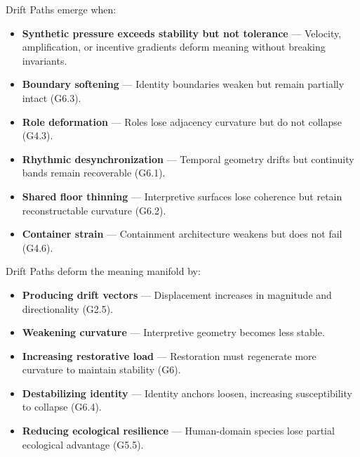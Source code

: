 \medskip

\noindent Drift Paths emerge when:

\begin{itemize}[leftmargin=1.2cm]
    \item \textbf{Synthetic pressure exceeds stability but not tolerance} —
    Velocity, amplification, or incentive gradients deform meaning without
    breaking invariants.

    \item \textbf{Boundary softening} — Identity boundaries weaken but remain
    partially intact (G6.3).

    \item \textbf{Role deformation} — Roles lose adjacency curvature but do not
    collapse (G4.3).

    \item \textbf{Rhythmic desynchronization} — Temporal geometry drifts but
    continuity bands remain recoverable (G6.1).

    \item \textbf{Shared floor thinning} — Interpretive surfaces lose coherence
    but retain reconstructable curvature (G6.2).

    \item \textbf{Container strain} — Containment architecture weakens but does
    not fail (G4.6).
\end{itemize}

\medskip

\noindent Drift Paths deform the meaning manifold by:

\begin{itemize}[leftmargin=1.2cm]
    \item \textbf{Producing drift vectors} — Displacement increases in magnitude
    and directionality (G2.5).

    \item \textbf{Weakening curvature} — Interpretive geometry becomes less
    stable.

    \item \textbf{Increasing restorative load} — Restoration must regenerate more
    curvature to maintain stability (G6).

    \item \textbf{Destabilizing identity} — Identity anchors loosen, increasing
    susceptibility to collapse (G6.4).

    \item \textbf{Reducing ecological resilience} — Human-domain species lose
    partial ecological advantage (G5.5).
\end{itemize}

